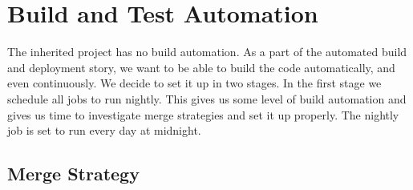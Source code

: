 \section{Build and Test Automation}\label{sec:build_automation}
The inherited project has no build automation. As a part of the automated build and deployment story, we want to be able to build the code automatically, and even continuously. We decide to set it up in two stages. In the first stage we schedule all jobs to run nightly. This gives us some level of build automation and gives us time to investigate merge strategies and set it up properly. The nightly job is set to run every day at midnight.

\subsection{Merge Strategy}\label{sec:branching_strategy}

